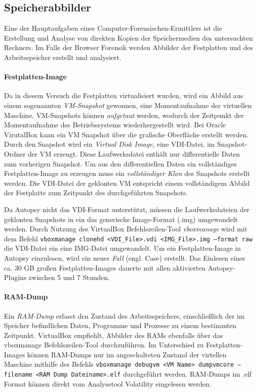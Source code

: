 \subsection*{Speicherabbilder}
\label{subsection:methodik-datensammlung-speicherabbilder}
Eine der Hauptaufgaben eines Computer-Forensischen-Ermittlers ist die Erstellung und Analyse von direkten Kopien der Speichermedien des untersuchten Rechners. \cite{Hassan.2019}
Im Falle der Browser Forensik werden Abbilder der Festplatten und des Arbeitsspeicher erstellt und analysiert.

\paragraph*{Festplatten-Image}
Da in diesem Versuch die Festplatten virtualisiert wurden, wird ein Abbild aus einem sogenannten \textit{VM-Snapshot} gewonnen, eine Momentaufnahme der virtuellen Maschine.  %
VM-Snapshots können \textit{aufgetaut} werden, wodurch der Zeitpunkt der Momentaufnahme des Betriebssystems wiederhergestellt wird.
Bei Oracle VirutalBox kann ein VM Snapshot über die grafische Oberfläche erstellt werden.
Durch den Snapshot wird ein \textit{Virtual Disk Image}, eine VDI-Datei, im Snapshot-Ordner der VM erzeugt. Diese Laufwerksdatei enthält nur differentielle Daten zum vorherigen Snapshot.
Um aus den differentiellen Daten ein vollständiges Festplatten-Image zu erzeugen muss ein \textit{vollständiger Klon} des Snapshots erstellt werden. Die VDI-Datei der geklonten VM entspricht einem vollständigem Abbild der Festplatte zum Zeitpunkt des durchgeführten Snapshots.

Da Autopsy nicht das VDI-Format unterstützt, müssen die Laufwerksdateien der geklonten Snapshots in ein das generische Image-Format (.img) umgewandelt werden.
Durch Nutzung des VirtualBox Befehlszeilen-Tool \textit{vboxmanage} wird mit dem Befehl \texttt{vboxmanage clonehd <VDI\_File>.vdi <IMG\_File>.img --format raw} die VDI-Datei ein eine IMG-Datei umgewandelt.
Um ein Festplatten-Image in Autopsy einzulesen, wird ein neuer \textit{Fall} (engl. Case) erstellt. Das Einlesen eines ca. 30 GB großen Festplatten-Images dauerte mit allen aktivierten Autopsy-Plugins zwischen 5 und 7 Stunden.

\paragraph*{RAM-Dump}
Ein \textit{RAM-Dump} erfasst den Zustand des Arbeitsspeichers, einschließlich der im Speicher befindlichen Daten, Programme und Prozesse zu einem bestimmten Zeitpunkt.
VirtualBox empfiehlt, Abbilder des RAMs ebenfalls über das vboxmanage Befehlszeilen-Tool durchzuführen.
Im Unterschied zu Festplatten-Images können RAM-Dumps nur im angeschalteten Zustand der virtellen Maschine mithilfe des Befehls \texttt{vboxmanage debugvm <VM Name> dumpvmcore --filename <RAM Dump Dateiname>.elf} durchgeführt werden. RAM-Dumps im .elf Format können direkt vom Analysetool Volatility eingelesen werden.		

